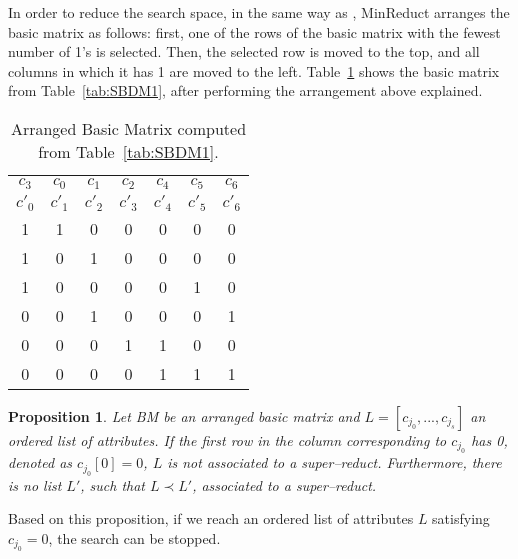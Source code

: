 \documentclass[authoryear,preprint,review,12pt]{elsarticle}
\newtheorem{proposition}{Proposition}
\begin{document}
	In order to reduce the search space, in the same way as \citep{Sanchez07,Lias13,Rodriguez2018}, MinReduct arranges the basic matrix as follows: first, one of the rows of the basic matrix with the fewest number of 1's is selected. Then, the selected row is moved to the top, and all columns in which it has 1 are moved to the left. Table~\ref{tab:SSBDM1} shows the basic matrix from Table~\ref{tab:SBDM1}, after performing the arrangement above explained.
	
	\begin{table}[htb]
		\caption{Arranged Basic Matrix computed from Table~\ref{tab:SBDM1}.}
		\centering
		\begin{tabular}{ccccccc}\label{tab:SSBDM1}
			$c_3$ & $c_0$ & $c_1$ & $c_2$ & $c_4$ & $c_5$ & $c_6$\\
			$c'_0$ & $c'_1$ & $c'_2$ & $c'_3$ & $c'_4$ & $c'_5$ & $c'_6$\\
			\hline
			1&1&0&0&0&0&0\\
			1&0&1&0&0&0&0\\
			1&0&0&0&0&1&0\\
			0&0&1&0&0&0&1\\
			0&0&0&1&1&0&0\\
			0&0&0&0&1&1&1\\
		\end{tabular}             
	\end{table}  
	
	\begin{proposition}\label{prop:firstRow}
		Let BM be an arranged basic matrix and $L = [c_{j_0},...,c_{j_s}]$ an ordered list of attributes. If the first row in the column corresponding to $c_{j_0}$ has 0, denoted as $c_{j_0}[0]=0$, $L$ is not associated to a super--reduct. Furthermore, there is no list $L'$, such that $L\prec L'$, associated to a super--reduct.
	\end{proposition}
	
	
	Based on this proposition, if we reach an ordered list of attributes $L$ satisfying $c_{j_0}=0$, the search can be stopped. 
	
\end{document}
